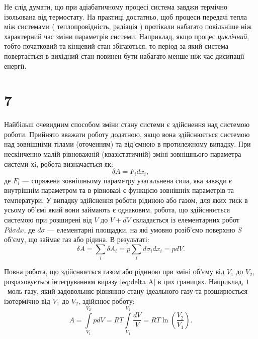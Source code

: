 Не слід думати, що при адіабатичному процесі система завджи термічно ізольована від термостату. На практиці достатньо, щоб процеси передачі тепла між системами ( теплопровідність, радіація ) протікали набагато повільніше ніж характерний час зміни параметрів системи. Наприклад, якщо процес \emph{циклічний}, тобто початковий та кінцевий стан збігаються, то період за який система повертається в вихідний стан повинен бути набагато менше ніж час дисипації енергії.




\section{7}




Найбільш очевидним способом зміни стану системи є здійснення над системою роботи. Прийнято вважати роботу додатною, якщо вона здійснюється системою над зовнішніми тілами (оточенням) та від’ємною в протилежному випадку. При нескінченно малій рівноважній (квазістатичній) зміні зовнішнього параметра системи хi, робота визначається як:
\begin{equation*}
    \delta A = F_i dx_i,
\end{equation*}
де $F_i$ --- спряжена зовнішньому параметру узагальнена сила, яка завжди є внутрішнім параметром та в рівновазі є функцією зовнішніх параметрів та температури. У випадку здійснення роботи рідиною або газом, для яких тиск в усьому об'ємі який вони займають є однаковим, робота, що здійснюється системою при розширені від $V$ до $V+dV$ складається із елементарних робот $Pd\sigma dx$, де $d\sigma$ --- елементарні площадки, на які умовно розіб'ємо поверхню $S$ об’єму, що займає газ або рідина. В результаті:
\begin{equation}\label{eq:delta A}
    \delta A = \sum\limits_i\delta A_i = p \sum\limits_i d\sigma_i dx_i = p dV.
\end{equation}


Повна робота, що здійснюється газом або рідиною при зміні об’єму від $V_1$ до $V_2$, розраховується інтегруванням виразу \eqref{eq:delta A} в цих границях. Наприклад, $1$~моль газу, який задовольняє рівнянню стану ідеального газу та розширюється ізотермічно від $V_1$ до $V_2$, здійснює роботу:
\begin{equation*}\label{eq:2a}\tag{2а}
    A = \int\limits_{V_1}^{V_2} p dV = RT  \int\limits_{V_1}^{V_2} \frac{dV}{V} = RT \ln\left(\frac{V_2}{V_1}\right).
\end{equation*}

